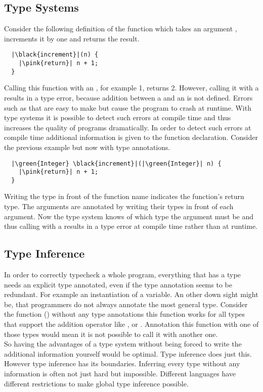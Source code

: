 \subsection{Type Systems}
Consider the following definition of the function  which takes an argument ,
increments it by one and returns the result.
\begin{verbatim}
  |\black{increment}|(n) {
    |\pink{return}| n + 1;
  }
\end{verbatim}
Calling this function with an , for example 1, returns 2.
However, calling it with a  results in a type error, because addition between a 
and an  is not defined.
Errors such as that are easy to make but cause the program to crash at runtime.
With type systems it is possible to detect such errors at compile time and thus increases the quality of programs dramatically.
In order to detect such errors at compile time additional information is given to the function declaration.
Consider the previous example but now with type annotations.
\begin{verbatim}
  |\green{Integer} \black{increment}|(|\green{Integer}| n) {
    |\pink{return}| n + 1;
  }
\end{verbatim}
Writing the type  in front of the function name indicates the function's return type.
The arguments are annotated by writing their types in front of each argument.
Now the type system knows of which type the argument must be and thus calling  with a  results in a type error at compile time rather than at runtime.

\subsection{Type Inference}
In order to correctly typecheck a whole program, everything that has a type needs an explicit type annotated,
even if the type annotation seems to be redundant. For example an instantiation of a variable.
An other down sight might be, that programmers do not always annotate the most general type. Consider the function  (\inl{+}) without any type annotations this function works for all types that support the addition operator like ,  or .
Annotation this  function with one of those types would mean it is not possible to call it with another one.\\
So having the advantages of a type system without being forced to write the additional information yourself would be optimal. Type inference does just this.
However type inference has its boundaries. Inferring every type without any information is often not just hard but impossible. Different languages have different restrictions to make global type inference possible.


